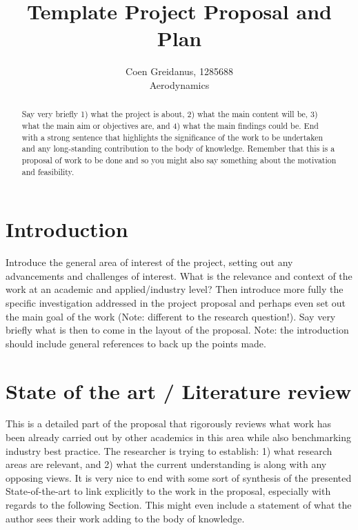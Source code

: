 \documentclass{article}
\title{Template Project Proposal and Plan}
\author{Coen Greidanus, 1285688\\
Aerodynamics}
\begin{document}
\maketitle

\begin{abstract}

Say very briefly 1) what the project is about, 2) what the main content will be, 3) what the main aim or objectives are, and 4) what the main findings could be. End with a strong sentence that highlights the significance of the work to be undertaken and any long-standing contribution to the body of knowledge. Remember that this is a proposal of work to be done and so you might also say something about the motivation and feasibility.

\end{abstract}

\section{Introduction}
\label{sec:intro}

Introduce the general area of interest of the project, setting out any advancements and challenges of interest. What is the relevance and context of the work at an academic and applied/industry level? Then introduce more fully the specific investigation addressed in the project proposal and perhaps even set out the main goal of the work (Note: different to the research question!). Say very briefly what is then to come in the layout of the proposal. Note: the introduction should include general references to back up the points made.

\section{State of the art / Literature review}
\label{sec:litreview}

This is a detailed part of the proposal that rigorously reviews what work has been already carried out by other academics in this area while also benchmarking industry best practice. The researcher is trying to establish: 1) what research areas are relevant, and 2) what the current understanding is along with any opposing views. It is very nice to end with some sort of synthesis of the presented State-of-the-art to link explicitly to the work in the proposal, especially with regards to the following Section. This might even include a statement of what the author sees their work adding to the body of knowledge.
\end{document}
